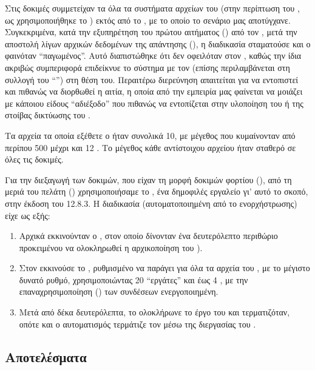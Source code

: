 Στις δοκιμές συμμετείχαν τα όλα τα συστήματα αρχείων του \osv{} (στην περίπτωση
του \viofs{}, ως  χρησιμοποιήθηκε το )
εκτός από το , με το οποίο το σενάριο μας αποτύγχανε. Συγκεκριμένα, κατά
την εξυπηρέτηση του πρώτου αιτήματος () από τον , μετά
την αποστολή λίγων αρχικών δεδομένων της απάντησης (), η διαδικασία
σταματούσε και ο \guest{} φαινόταν ``παγωμένος''. Αυτό διαπιστώθηκε ότι δεν
οφειλόταν στον , καθώς την ίδια ακριβώς συμπεριφορά επιδείκνυε το
σύστημα με τον  (επίσης περιλαμβάνεται στη συλλογή του
``'') στη θέση του. Περαιτέρω διερεύνηση απαιτείται για να
εντοπιστεί και πιθανώς να διορθωθεί η αιτία, η οποία από την εμπειρία μας
φαίνεται να μοιάζει με κάποιου είδους ``αδιέξοδο'' που πιθανώς να εντοπίζεται
στην υλοποίηση του  ή της στοίβας δικτύωσης του \osv{}.

Τα αρχεία τα οποία εξέθετε ο  ήταν συνολικά 10, με μέγεθος που
κυμαίνονταν από περίπου 500  μέχρι και 12 . Το μέγεθος κάθε
αντίστοιχου αρχείου ήταν σταθερό σε όλες τις δοκιμές.

Για την διεξαγωγή των δοκιμών, που είχαν τη μορφή δοκιμών φορτίου 
(), από τη μεριά του πελάτη ()
χρησιμοποιήσαμε το  \cite{vegeta}, ένα δημοφιλές εργαλείο γι' αυτό το
σκοπό, στην έκδοση του 12.8.3. Η διαδικασία (αυτοματοποιημένη από το 
ενορχήστρωσης) είχε ως εξής:
\begin{enumerate}
    \item Αρχικά εκκινούνταν ο \osv{} \guest{}, στον οποίο δίνονταν ένα
          δευτερόλεπτο περιθώριο προκειμένου να ολοκληρωθεί η αρχικοποίηση του
          ).
    \item Στον \host{} εκκινούσε το , ρυθμισμένο να παράγει  για όλα τα αρχεία του , με το μέγιστο
          δυνατό ρυθμό, χρησιμοποιώντας 20 ``εργάτες'' και έως 4 , με
          την επαναχρησιμοποίηση () των συνδέσεων 
          ενεργοποιημένη.
    \item Μετά από δέκα δευτερόλεπτα, το  ολοκλήρωνε το έργο του και
          τερματιζόταν, οπότε και ο αυτοματισμός τερμάτιζε τον \guest{} μέσω
          της διεργασίας του \qemu{}.
\end{enumerate}

\subsection{Αποτελέσματα}

